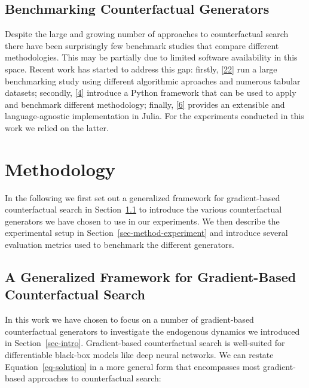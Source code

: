 \documentclass[
  conference]{IEEEtran}
\begin{document}
\hypertarget{sec-related-benchmark}{%
\subsection{Benchmarking Counterfactual
Generators}\label{sec-related-benchmark}}

Despite the large and growing number of approaches to counterfactual
search there have been surprisingly few benchmark studies that compare
different methodologies. This may be partially due to limited software
availability in this space. Recent work has started to address this gap:
firstly, \protect\hyperlink{ref-de2021framework}{{[}22{]}} run a large
benchmarking study using different algorithmic aproaches and numerous
tabular datasets; secondly,
\protect\hyperlink{ref-pawelczyk2021carla}{{[}4{]}} introduce a Python
framework that can be used to apply and benchmark different methodology;
finally,
\protect\hyperlink{ref-altmeyer2022CounterfactualExplanations}{{[}6{]}}
provides an extensible and language-agnostic implementation in Julia.
For the experiments conducted in this work we relied on the latter.

\hypertarget{sec-method}{%
\section{Methodology}\label{sec-method}}

In the following we first set out a generalized framework for
gradient-based counterfactual search in Section~\ref{sec-method-general}
to introduce the various counterfactual generators we have chosen to use
in our experiments. We then describe the experimental setup in
Section~\ref{sec-method-experiment} and introduce several evaluation
metrics used to benchmark the different generators.

\hypertarget{sec-method-general}{%
\subsection{A Generalized Framework for Gradient-Based Counterfactual
Search}\label{sec-method-general}}

In this work we have chosen to focus on a number of gradient-based
counterfactual generators to investigate the endogenous dynamics we
introduced in Section~\ref{sec-intro}. Gradient-based counterfactual
search is well-suited for differentiable black-box models like deep
neural networks. We can restate Equation~\ref{eq-solution} in a more
general form that encompasses most gradient-based approaches to
counterfactual search:
\end{document}
